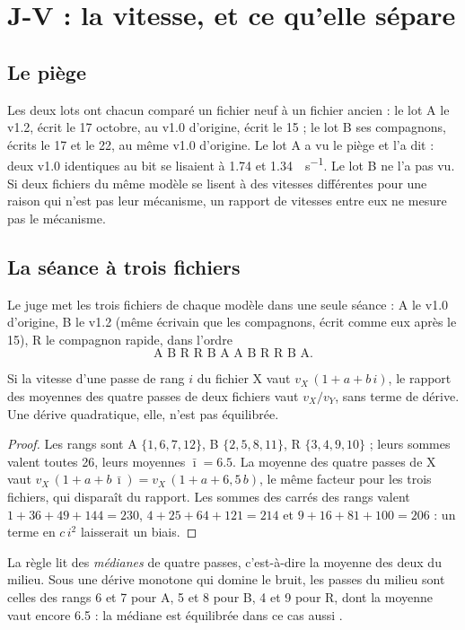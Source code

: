 \section{J-V : la vitesse, et ce qu'elle sépare}\label{t3jug:sec:vitesse}

\subsection{Le piège}\label{t3jug:sec:piege}

Les deux lots ont chacun comparé un fichier neuf à un fichier ancien : le lot A le v1.2, écrit le 17 octobre, au v1.0 d'origine, écrit le 15 ; le lot B ses compagnons, écrits le 17 et le 22, au même v1.0 d'origine. Le lot A a vu le piège et l'a dit : deux v1.0 identiques au bit se lisaient à \num{1.74} et \SI{1.34}{\Go\per\second}. Le lot B ne l'a pas vu. Si deux fichiers du même modèle se lisent à des vitesses différentes pour une raison qui n'est pas leur mécanisme, un rapport de vitesses entre eux ne mesure pas le mécanisme.

\subsection{La séance à trois fichiers}\label{t3jug:sec:plan}

Le juge met les trois fichiers de chaque modèle dans une seule séance : A le v1.0 d'origine, B le v1.2 (même écrivain que les compagnons, écrit comme eux après le 15), R le compagnon rapide, dans l'ordre
\[
\text{A B R R B A A B R R B A} .
\]

\begin{proposition}\label{t3jug:prop:plan}
Si la vitesse d'une passe de rang $i$ du fichier X vaut $v_X\,(1 + a + b\,i)$, le rapport des moyennes des quatre passes de deux fichiers vaut $v_X / v_Y$, sans terme de dérive. Une dérive quadratique, elle, n'est pas équilibrée.
\end{proposition}
\begin{proof}
Les rangs sont A $\{1, 6, 7, 12\}$, B $\{2, 5, 8, 11\}$, R $\{3, 4, 9, 10\}$ ; leurs sommes valent toutes 26, leurs moyennes $\bar\imath = \num{6.5}$. La moyenne des quatre passes de X vaut $v_X\,(1 + a + b\,\bar\imath) = v_X\,(1 + a + 6{,}5\,b)$, le même facteur pour les trois fichiers, qui disparaît du rapport. Les sommes des carrés des rangs valent $1 + 36 + 49 + 144 = 230$, $4 + 25 + 64 + 121 = 214$ et $9 + 16 + 81 + 100 = 206$ : un terme en $c\,i^2$ laisserait un biais.
\end{proof}
La règle lit des \emph{médianes} de quatre passes, c'est-à-dire la moyenne des deux du milieu. Sous une dérive monotone qui domine le bruit, les passes du milieu sont celles des rangs 6 et 7 pour A, 5 et 8 pour B, 4 et 9 pour R, dont la moyenne vaut encore \num{6.5} : la médiane est équilibrée dans ce cas aussi \calc.

